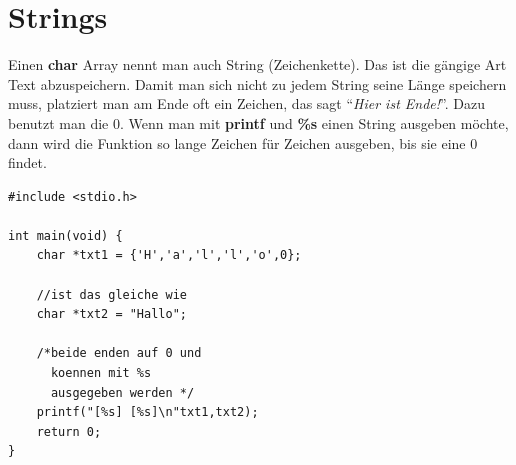 \documentclass[c_worksheet.tex]{subfiles}
\begin{document}
\section{Strings}

Einen \textbf{char} Array nennt man auch String (Zeichenkette). Das ist die gängige Art Text abzuspeichern. Damit man sich nicht zu jedem String seine Länge speichern muss, platziert man am Ende oft ein Zeichen, das sagt ``\textit{Hier ist Ende!}''. Dazu benutzt man die 0. Wenn man mit \textbf{printf} und \textbf{\%s} einen String ausgeben möchte, dann wird die Funktion so lange Zeichen für Zeichen ausgeben, bis sie eine 0 findet.

\begin{lstlisting}
#include <stdio.h>

int main(void) {
    char *txt1 = {'H','a','l','l','o',0};

    //ist das gleiche wie
    char *txt2 = "Hallo";

    /*beide enden auf 0 und
      koennen mit %s
      ausgegeben werden */
    printf("[%s] [%s]\n"txt1,txt2);
    return 0;
}
\end{lstlisting} 
\end{document}
